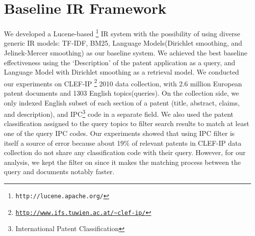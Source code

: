 \documentclass{sig-alternate}
\begin{document}
\section{Baseline IR Framework}
We developed a Lucene-based%
\footnote{\texttt{http://lucene.apache.org/}%
} IR system with the possibility of using diverse generic IR models: TF-IDF, BM25, Language Models(Dirichlet smoothing, and Jelinek-Mercer smoothing) as our baseline system. We achieved the best baseline effectiveness using the `Description' of the patent application as a query\cite{xue2009transforming}, and Language Model with Dirichlet smoothing as a retrieval model. We conducted our experiments on CLEF-IP%
\footnote{\texttt{\url{http://www.ifs.tuwien.ac.at/~clef-ip/}}}%
 2010 data collection, with 2.6 million European patent documents and 1303 English topics(queries). On the collection side, we only indexed English subset of each section of a patent (title, abstract, claims, and description), and IPC\footnote{International Patent Classification}%
  code in a separate field\cite{magdy2012toward}. We also used the patent classification assigned to the query topics to filter search results to match at least one of the query IPC codes\cite{lopez2010patatras}. Our experiments showed that using IPC filter is itself a source of error because about 19\% of relevant patents in CLEF-IP data collection do not share any classification code with their query. However, for our analysis, we kept the filter on since it makes the matching process between the query and documents notably faster.
\end{document}
